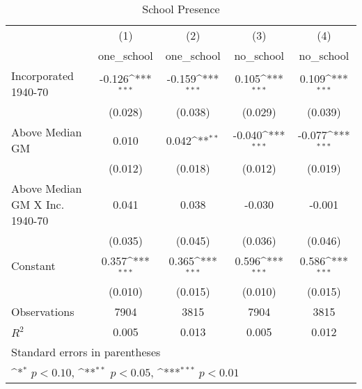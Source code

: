 \begin{table}[htbp]\centering
\def\sym#1{\ifmmode^{#1}\else\(^{#1}\)\fi}
\caption{School Presence}
\begin{tabular}{l*{4}{c}}
\hline\hline
                    &\multicolumn{1}{c}{(1)}&\multicolumn{1}{c}{(2)}&\multicolumn{1}{c}{(3)}&\multicolumn{1}{c}{(4)}\\
                    &\multicolumn{1}{c}{one\_school}&\multicolumn{1}{c}{one\_school}&\multicolumn{1}{c}{no\_school}&\multicolumn{1}{c}{no\_school}\\
\hline
Incorporated 1940-70&      -0.126\sym{***}&      -0.159\sym{***}&       0.105\sym{***}&       0.109\sym{***}\\
                    &     (0.028)         &     (0.038)         &     (0.029)         &     (0.039)         \\
[1em]
Above Median GM     &       0.010         &       0.042\sym{**} &      -0.040\sym{***}&      -0.077\sym{***}\\
                    &     (0.012)         &     (0.018)         &     (0.012)         &     (0.019)         \\
[1em]
Above Median GM X Inc. 1940-70&       0.041         &       0.038         &      -0.030         &      -0.001         \\
                    &     (0.035)         &     (0.045)         &     (0.036)         &     (0.046)         \\
[1em]
Constant            &       0.357\sym{***}&       0.365\sym{***}&       0.596\sym{***}&       0.586\sym{***}\\
                    &     (0.010)         &     (0.015)         &     (0.010)         &     (0.015)         \\
\hline
Observations        &        7904         &        3815         &        7904         &        3815         \\
\(R^{2}\)           &       0.005         &       0.013         &       0.005         &       0.012         \\
\hline\hline
\multicolumn{5}{l}{\footnotesize Standard errors in parentheses}\\
\multicolumn{5}{l}{\footnotesize \sym{*} \(p<0.10\), \sym{**} \(p<0.05\), \sym{***} \(p<0.01\)}\\
\end{tabular}
\end{table}
